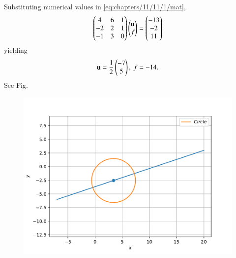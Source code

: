 Substituting numerical values in 
	\eqref{eq:chapters/11/11/1/mat},
\begin{align}
	\label{eq:vertex_system}
	\begin{pmatrix}4&6&1\\-2& 2&1\\-1& 3&0\end{pmatrix}\begin{pmatrix}\mathbf{u}\\f\end{pmatrix} = \begin{pmatrix}-13\\-2 \\11\end{pmatrix}
\end{align}
yielding
\begin{align}
	\mathbf{u}=\frac{1}{2}\begin{pmatrix}-7 \\5\end{pmatrix},\
f=-14.
\end{align}
See Fig. 
	\begin{figure}[!ht]
		\centering
 \includegraphics[width=\columnwidth]{chapters/11/11/1/11/figs/fig.pdf}
		\caption{}
		\label{fig:11/11/1/11}
  	\end{figure}
